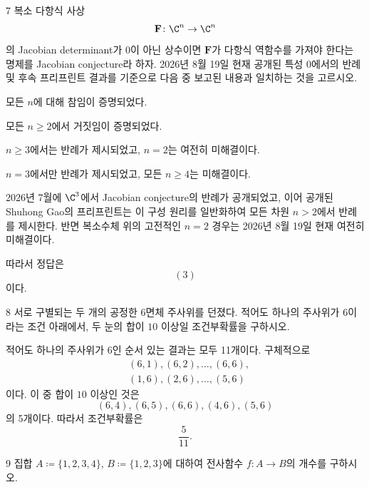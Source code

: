 \begin{problem}{7}
복소 다항식 사상
\[
    \mathbf{F}\colon\C^n\to\C^n
\]
의 Jacobian determinant가 0이 아닌 상수이면 $\mathbf{F}$가 다항식 역함수를 가져야 한다는 명제를 Jacobian conjecture라 하자. 2026년 8월 19일 현재 공개된 특성 0에서의 반례 및 후속 프리프린트 결과를 기준으로 다음 중 보고된 내용과 일치하는 것을 고르시오.

\begin{problemchoices}
    \item 모든 $n$에 대해 참임이 증명되었다.
    \item 모든 $n\geq2$에서 거짓임이 증명되었다.
    \item $n\geq3$에서는 반례가 제시되었고, $n=2$는 여전히 미해결이다.
    \item $n=3$에서만 반례가 제시되었고, 모든 $n\geq4$는 미해결이다.
\end{problemchoices}
\end{problem}

\begin{solution}
2026년 7월에 $\C^3$에서 Jacobian conjecture의 반례가 공개되었고, 이어 공개된 Shuhong Gao의 프리프린트는 이 구성 원리를 일반화하여 모든 차원 $n>2$에서 반례를 제시한다. 반면 복소수체 위의 고전적인 $n=2$ 경우는 2026년 8월 19일 현재 여전히 미해결이다.

따라서 정답은
\[
    \boxed{(3)}
\]
이다.
\end{solution}

\begin{problem}{8}
서로 구별되는 두 개의 공정한 6면체 주사위를 던졌다. 적어도 하나의 주사위가 $6$이라는 조건 아래에서, 두 눈의 합이 $10$ 이상일 조건부확률을 구하시오.
\end{problem}

\begin{solution}
적어도 하나의 주사위가 $6$인 순서 있는 결과는 모두 11개이다. 구체적으로
\[
    \begin{aligned}
        &(6,1),(6,2),\ldots,(6,6),\\
        &(1,6),(2,6),\ldots,(5,6)
    \end{aligned}
\]
이다. 이 중 합이 $10$ 이상인 것은
\[
    (6,4),(6,5),(6,6),(4,6),(5,6)
\]
의 5개이다. 따라서 조건부확률은
\[
    \boxed{\frac5{11}}.
\]
\end{solution}

\begin{problem}{9}
집합 $A\coloneqq \{1,2,3,4\}$, $B\coloneqq \{1,2,3\}$에 대하여 전사함수 $f\colon A\to B$의 개수를 구하시오.
\end{problem}

